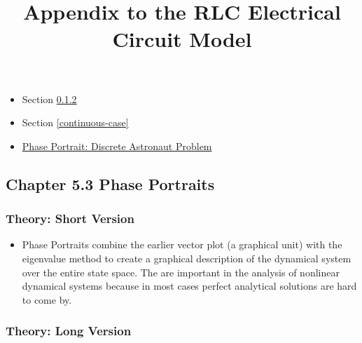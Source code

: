 \documentclass[11pt]{article}
\title{Appendix to the RLC Electrical Circuit Model}
\providecommand{\tightlist}{%
      \setlength{\itemsep}{0pt}\setlength{\parskip}{0pt}}
\begin{document}
    
    
    \maketitle
    
    

    
    \begin{itemize}
\tightlist
\item
  Section \ref{theory-long-version}
\item
  Section \ref{continuous-case}
\item
  \href{}{Phase Portrait: Discrete Astronaut Problem}
\end{itemize}

    \hypertarget{chapter-5.3-phase-portraits}{%
\subsection{Chapter 5.3 Phase
Portraits}\label{chapter-5.3-phase-portraits}}

\hypertarget{theory-short-version}{%
\subsubsection{Theory: Short Version}\label{theory-short-version}}

\begin{itemize}
\tightlist
\item
  Phase Portraits combine the earlier vector plot (a graphical unit)
  with the eigenvalue method to create a graphical description of the
  dynamical system over the entire state space. The are important in the
  analysis of nonlinear dynamical systems because in most cases perfect
  analytical solutions are hard to come by.
\end{itemize}

\hypertarget{theory-long-version}{%
\subsubsection{Theory: Long Version}\label{theory-long-version}}
\end{document}
